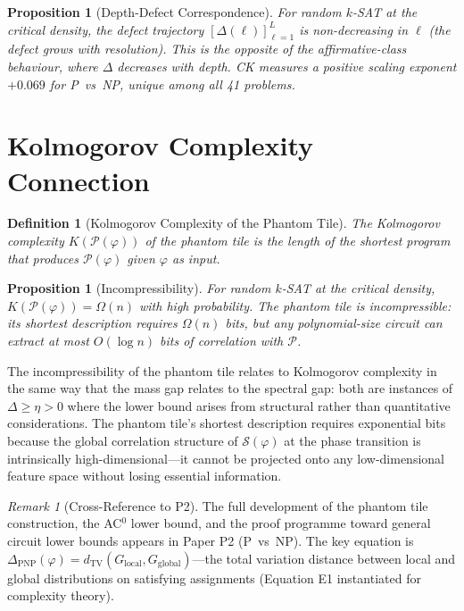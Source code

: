 \documentclass[12pt, openany]{book}
\newtheorem{proposition}[theorem]{Proposition}
\newtheorem{definition}[theorem]{Definition}
\theoremstyle{remark}
\newtheorem{remark}[theorem]{Remark}
\begin{document}
\begin{proposition}[Depth-Defect Correspondence]
\label{prop:depth-defect}
For random $k$-SAT at the critical density, the defect trajectory
$[\Delta(\ell)]_{\ell=1}^{L}$ is non-decreasing in $\ell$ (the defect
\emph{grows} with resolution).  This is the opposite of the affirmative-class
behaviour, where $\Delta$ decreases with depth.  CK measures a positive
scaling exponent $+0.069$ for P~vs~NP, unique among all 41 problems.
\end{proposition}


\section{Kolmogorov Complexity Connection}
\label{sec:kolmogorov}

\begin{definition}[Kolmogorov Complexity of the Phantom Tile]
\label{def:kolmogorov}
The Kolmogorov complexity $K(\mathcal{P}(\varphi))$ of the phantom tile is
the length of the shortest program that produces $\mathcal{P}(\varphi)$ given
$\varphi$ as input.
\end{definition}

\begin{proposition}[Incompressibility]
\label{prop:incompressible}
For random $k$-SAT at the critical density, $K(\mathcal{P}(\varphi)) = \Omega(n)$
with high probability.  The phantom tile is \emph{incompressible}: its shortest
description requires $\Omega(n)$ bits, but any polynomial-size circuit can
extract at most $O(\log n)$ bits of correlation with $\mathcal{P}$.
\end{proposition}

\noindent
The incompressibility of the phantom tile relates to Kolmogorov complexity in the
same way that the mass gap relates to the spectral gap: both are instances of
$\Delta \geq \eta > 0$ where the lower bound arises from structural rather than
quantitative considerations.  The phantom tile's shortest description requires
exponential bits because the global correlation structure of $\mathcal{S}(\varphi)$
at the phase transition is intrinsically high-dimensional---it cannot be projected
onto any low-dimensional feature space without losing essential information.

\begin{remark}[Cross-Reference to P2]
The full development of the phantom tile construction, the AC$^0$ lower bound,
and the proof programme toward general circuit lower bounds appears in Paper P2
(P~vs~NP).  The key equation is $\Delta_{\mathrm{PNP}}(\varphi) = d_{\mathrm{TV}}(G_{\mathrm{local}}, G_{\mathrm{global}})$---the
total variation distance between local and global distributions on satisfying
assignments (Equation E1 instantiated for complexity theory).
\end{remark}
\end{document}
